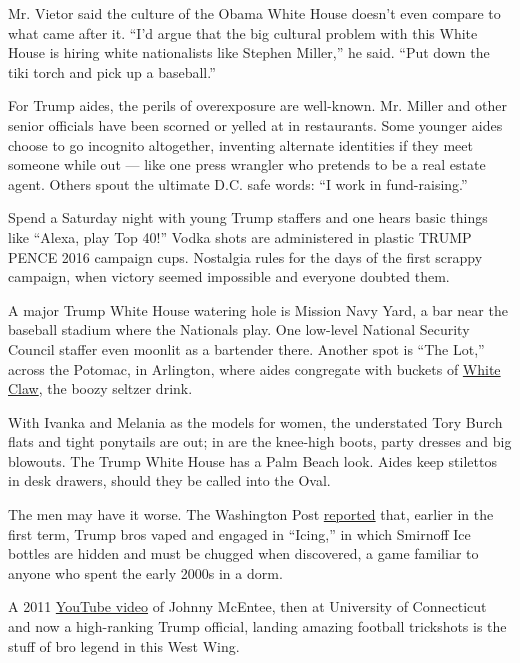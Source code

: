 Mr. Vietor said the culture of the Obama White House doesn't even
compare to what came after it. ``I'd argue that the big cultural problem
with this White House is hiring white nationalists like Stephen
Miller,'' he said. ``Put down the tiki torch and pick up a baseball.''

For Trump aides, the perils of overexposure are well-known. Mr. Miller
and other senior officials have been scorned or yelled at in
restaurants. Some younger aides choose to go incognito altogether,
inventing alternate identities if they meet someone while out --- like
one press wrangler who pretends to be a real estate agent. Others spout
the ultimate D.C. safe words: ``I work in fund-raising.''

Spend a Saturday night with young Trump staffers and one hears basic
things like ``Alexa, play Top 40!'' Vodka shots are administered in
plastic TRUMP PENCE 2016 campaign cups. Nostalgia rules for the days of
the first scrappy campaign, when victory seemed impossible and everyone
doubted them.

A major Trump White House watering hole is Mission Navy Yard, a bar near
the baseball stadium where the Nationals play. One low-level National
Security Council staffer even moonlit as a bartender there. Another spot
is ``The Lot,'' across the Potomac, in Arlington, where aides congregate
with buckets of
\href{https://www.nytimes3xbfgragh.onion/2019/09/05/style/white-claw-popular-memes.html}{White
Claw}, the boozy seltzer drink.

With Ivanka and Melania as the models for women, the understated Tory
Burch flats and tight ponytails are out; in are the knee-high boots,
party dresses and big blowouts. The Trump White House has a Palm Beach
look. Aides keep stilettos in desk drawers, should they be called into
the Oval.

The men may have it worse. The Washington Post
\href{https://www.washingtonpost.com/investigations/behind-the-chaos-office-that-vets-trump-appointees-plagued-by-inexperience/2018/03/30/cde31a1a-28a3-11e8-ab19-06a445a08c94_story.html}{reported}
that, earlier in the first term, Trump bros vaped and engaged in
``Icing,'' in which Smirnoff Ice bottles are hidden and must be chugged
when discovered, a game familiar to anyone who spent the early 2000s in
a dorm.

A 2011 \href{https://www.youtube.com/watch?v=9Ggia03nT40}{YouTube video}
of Johnny McEntee, then at University of Connecticut and now a
high-ranking Trump official, landing amazing football trickshots is the
stuff of bro legend in this West Wing.

